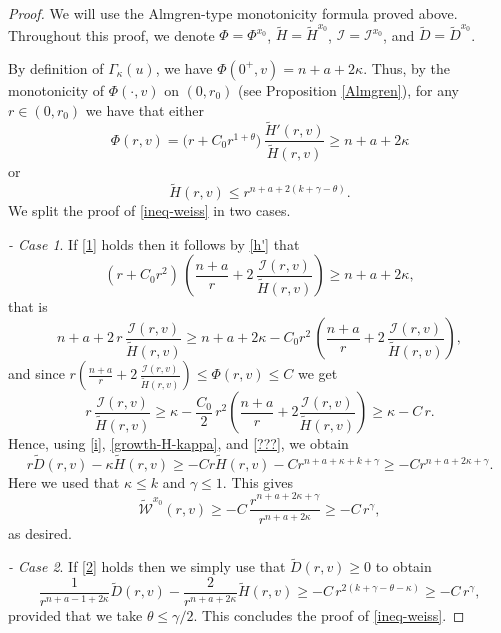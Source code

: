 \documentclass[11pt]{amsart}
\theoremstyle{plain}
\numberwithin{equation}{section}
\begin{document}
\begin{proof}
We will use the Almgren-type monotonicity formula proved above.
Throughout this proof, we denote $\Phi=\Phi^{x_0}$, $\tilde{H}=\tilde{H}^{x_0}$, $\mathcal{I}=\mathcal{I}^{x_0}$, and $\tilde{D}=\tilde{D}^{x_0}$.

By definition of $\Gamma_{\kappa}(u)$, we have $\Phi(0^{+},v)=n+a+2\kappa$.
Thus, by the monotonicity of $\Phi(\cdot,v)$ on $(0,r_0)$ (see Proposition \ref{Almgren}), for any $r \in (0,r_0)$ we have that either
\begin{equation}\label{1}
\Phi(r,v)=\bigl(r+C_0r^{1+\theta}\bigr)\,\frac{\tilde{H}'(r,v)}{\tilde{H}(r,v)}\geq n+a+2\kappa
\end{equation}
or
\begin{equation}\label{2}
\tilde{H}(r,v)\leq r^{n+a+2(k+\gamma-\theta)}.
\end{equation}
We split the proof of \eqref{ineq-weiss} in two cases.

\vspace{2mm}

\noindent
\emph{- Case 1}. If \eqref{1} holds then it follows by \eqref{h'} that
$$
(r+C_0r^2)\,\left(\frac{n+a}{r}+2\,\frac{{\mathcal{I}(r,v)}}{\tilde{H}(r,v)}\right)\geq n+a+2\kappa,
$$
that is
$$
n+a+2\,r\,\frac{{\mathcal{I}(r,v)}}{\tilde{H}(r,v)}\geq
 n+a+2\kappa- C_0r^2\,\left(\frac{n+a}{r}+2\,\frac{{\mathcal{I}(r,v)}}{\tilde{H}(r,v)}\right),
$$
and since $r\left(\frac{n+a}{r}+2\,\frac{{\mathcal{I}(r,v)}}{\tilde{H}(r,v)}\right)\leq \Phi(r,v)\leq C$ we get
$$
r\,\frac{{\mathcal{I}(r,v)}}{\tilde{H}(r,v)}\geq \kappa-\frac{C_0}{2}\,r^2\left(\frac{n+a}{r}+2\frac{{\mathcal{I}(r,v)}}{\tilde{H}(r,v)}\right)\geq \kappa-C\,r.
$$
Hence, using \eqref{i}, \eqref{growth-H-kappa}, and \eqref{???}, we obtain
\[r\tilde{D}(r,v)-\kappa \tilde{H}(r,v)\geq -Cr\tilde{H}(r,v)-Cr^{n+a+\kappa+k+\gamma}\geq -Cr^{n+a+2\kappa+\gamma}.\]
Here we used that $\kappa\leq k$ and $\gamma\leq1$.
This gives
\[\tilde{\mathcal{W}}^{x_0}(r,v)\geq -C\,\frac{r^{n+a+2\kappa+\gamma}}{r^{n+a+2\kappa}}\geq -C\,r^{\gamma},\]
as desired.

\vspace{2mm}

\noindent
\emph{- Case 2}. If \eqref{2} holds then we simply use that $\tilde{D}(r,v)\geq0$ to obtain
\[\frac{1}{r^{n+a-1+2\kappa}}{\tilde{D}(r,v)}-\frac{2}{r^{n+a+2\kappa}}\tilde{H}(r,v)\geq -C\,r^{2(k+\gamma-\theta-\kappa)}\geq -C\,r^{\gamma},\]
provided that we take $\theta\leq \gamma/2$.
This concludes the proof of \eqref{ineq-weiss}.
\end{proof}
\end{document}
